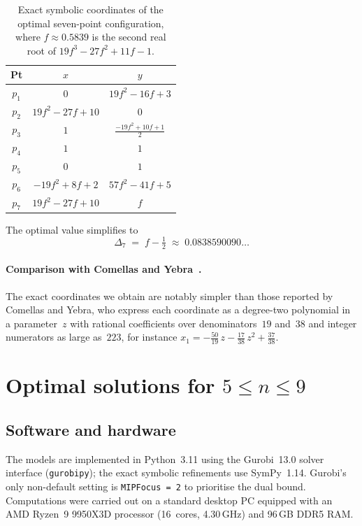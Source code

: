 \documentclass[11pt,a4paper]{article}
\theoremstyle{plain}
\theoremstyle{definition}
\theoremstyle{remark}
\begin{document}
  \begin{table}[h]
    \centering
    \begin{tabular}{c c c}
    \toprule
    Pt & $x$ & $y$ \\
    \midrule
    $p_1$ & $0$ & $19f^{2} - 16f + 3$ \\[6pt]
    $p_2$ & $19f^{2} - 27f + 10$ & $0$ \\[6pt]
    $p_3$ & $1$ & $\displaystyle \frac{-19f^{2} + 10f + 1}{2}$ \\[10pt]
    $p_4$ & $1$ & $1$ \\[6pt]
    $p_5$ & $0$ & $1$ \\[6pt]
    $p_6$ & $-19f^{2} + 8f + 2$ & $57f^{2}-41f+5$ \\[6pt]
    $p_7$ & $19f^{2} - 27f + 10$ & $f$ \\[6pt]
    \bottomrule
    \end{tabular}
    \caption{Exact symbolic coordinates of the optimal seven-point
    configuration, where $f \approx 0.5839$ is the second real root of
    $19f^3-27f^2+11f-1$.}
    \label{tab:n7-exact}
  \end{table}

  The optimal value simplifies to
  \[
    \Delta_7 \;=\; f - \tfrac{1}{2}
              \;\approx\; 0.0838590090\ldots
  \]

  \paragraph{Comparison with Comellas and Yebra~\cite{comellasyebra2002}.}
  The exact coordinates we obtain are notably simpler than those
  reported by Comellas and Yebra, who express
  each coordinate as a degree-two polynomial in a parameter~$z$
  with rational coefficients over denominators~$19$ and~$38$
  and integer numerators as large as~$223$, for
  instance $x_1 = -\tfrac{50}{19}\,z - \tfrac{17}{38}\,z^{2}
  + \tfrac{37}{38}$.
  
\section{Optimal solutions for $5\le n\le 9$}\label{sec:solutions}

    \subsection{Software and hardware}

  The models are implemented in Python~3.11 using the Gurobi~13.0 solver interface (\texttt{gurobipy}); the exact symbolic refinements use SymPy~1.14.
  Gurobi's only non-default setting is \texttt{MIPFocus\,=\,2} to prioritise the dual bound.
Computations were carried out on a standard desktop PC equipped with an AMD Ryzen~9 9950X3D processor (16~cores, 4.30\,GHz) and 96\,GB DDR5 RAM.
  
\end{document}

